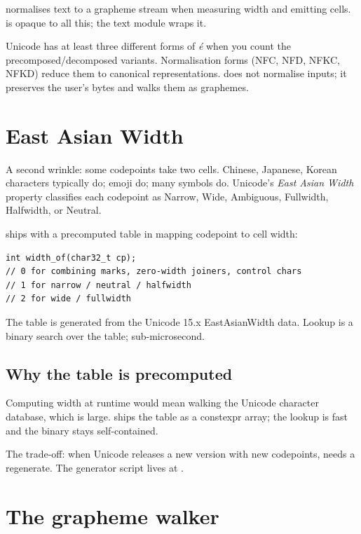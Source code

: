 \maya{} normalises text to a grapheme stream when measuring width
and emitting cells.  is opaque to all this; the
text module wraps it.

\begin{funfact}
Unicode has at least three different forms of \emph{é} when you
count the precomposed/decomposed variants. Normalisation forms
(NFC, NFD, NFKC, NFKD) reduce them to canonical representations.
\maya{} does not normalise inputs; it preserves the user's
bytes and walks them as graphemes.
\end{funfact}

\section{East Asian Width}

A second wrinkle: some codepoints take two cells. Chinese,
Japanese, Korean characters typically do; emoji do; many symbols
do. Unicode's \emph{East Asian Width} property classifies each
codepoint as Narrow, Wide, Ambiguous, Fullwidth, Halfwidth, or
Neutral.

\maya{} ships with a precomputed table in
 mapping
codepoint to cell width:

\begin{lstlisting}
int width_of(char32_t cp);
// 0 for combining marks, zero-width joiners, control chars
// 1 for narrow / neutral / halfwidth
// 2 for wide / fullwidth
\end{lstlisting}

The table is generated from the Unicode 15.x EastAsianWidth
data. Lookup is a binary search over the table; sub-microsecond.

\subsection*{Why the table is precomputed}

Computing width at runtime would mean walking the Unicode
character database, which is large. \maya{} ships the table as a
constexpr array; the lookup is fast and the binary stays
self-contained.

The trade-off: when Unicode releases a new version with new
codepoints, \maya{} needs a regenerate. The generator script
lives at .

\section{The grapheme walker}

